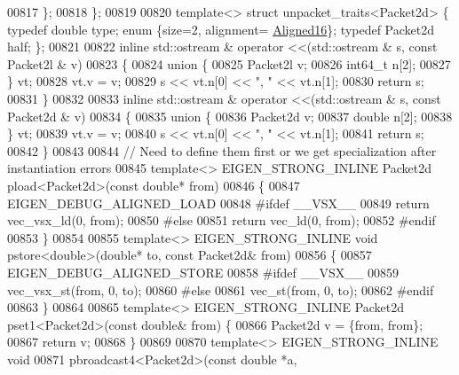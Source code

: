 \begin{DoxyCode}
{00817   \};
00818 \};
00819 
00820 \textcolor{keyword}{template}<> \textcolor{keyword}{struct }unpacket\_traits<Packet2d> \{ \textcolor{keyword}{typedef} \textcolor{keywordtype}{double} type; \textcolor{keyword}{enum} \{size=2, alignment=
      \hyperlink{group__enums_gga45fe06e29902b7a2773de05ba27b47a1af8e2bf74b04c02199f62c5e3c06dbfcc}{Aligned16}\}; \textcolor{keyword}{typedef} Packet2d half; \};
00821 
00822 \textcolor{keyword}{inline} std::ostream & operator <<(std::ostream & s, \textcolor{keyword}{const} Packet2l & v)
00823 \{
00824   \textcolor{keyword}{union }\{
00825     Packet2l   v;
00826     int64\_t n[2];
00827   \} vt;
00828   vt.v = v;
00829   s << vt.n[0] << \textcolor{stringliteral}{", "} << vt.n[1];
00830   \textcolor{keywordflow}{return} s;
00831 \}
00832 
00833 \textcolor{keyword}{inline} std::ostream & operator <<(std::ostream & s, \textcolor{keyword}{const} Packet2d & v)
00834 \{
00835   \textcolor{keyword}{union }\{
00836     Packet2d   v;
00837     \textcolor{keywordtype}{double} n[2];
00838   \} vt;
00839   vt.v = v;
00840   s << vt.n[0] << \textcolor{stringliteral}{", "} << vt.n[1];
00841   \textcolor{keywordflow}{return} s;
00842 \}
00843 
00844 \textcolor{comment}{// Need to define them first or we get specialization after instantiation errors}
00845 \textcolor{keyword}{template}<> EIGEN\_STRONG\_INLINE Packet2d pload<Packet2d>(\textcolor{keyword}{const} \textcolor{keywordtype}{double}* from)
00846 \{
00847   EIGEN\_DEBUG\_ALIGNED\_LOAD
00848 \textcolor{preprocessor}{#ifdef \_\_VSX\_\_}
00849   \textcolor{keywordflow}{return} vec\_vsx\_ld(0, from);
00850 \textcolor{preprocessor}{#else}
00851   \textcolor{keywordflow}{return} vec\_ld(0, from);
00852 \textcolor{preprocessor}{#endif}
00853 \}
00854 
00855 \textcolor{keyword}{template}<> EIGEN\_STRONG\_INLINE \textcolor{keywordtype}{void} pstore<double>(\textcolor{keywordtype}{double}*   to, \textcolor{keyword}{const} Packet2d& from)
00856 \{
00857   EIGEN\_DEBUG\_ALIGNED\_STORE
00858 \textcolor{preprocessor}{#ifdef \_\_VSX\_\_}
00859   vec\_vsx\_st(from, 0, to);
00860 \textcolor{preprocessor}{#else}
00861   vec\_st(from, 0, to);
00862 \textcolor{preprocessor}{#endif}
00863 \}
00864 
00865 \textcolor{keyword}{template}<> EIGEN\_STRONG\_INLINE Packet2d pset1<Packet2d>(\textcolor{keyword}{const} \textcolor{keywordtype}{double}&  from) \{
00866   Packet2d v = \{from, from\};
00867   \textcolor{keywordflow}{return} v;
00868 \}
00869 
00870 \textcolor{keyword}{template}<> EIGEN\_STRONG\_INLINE \textcolor{keywordtype}{void}
00871 pbroadcast4<Packet2d>(\textcolor{keyword}{const} \textcolor{keywordtype}{double} *a,
}
\end{DoxyCode}

